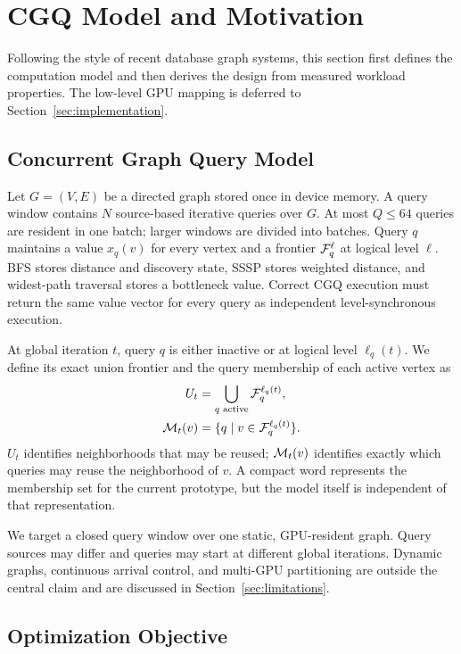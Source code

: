 \section{CGQ Model and Motivation}
\label{sec:background}

Following the style of recent database graph systems, this section first defines the computation model and then derives the design from measured workload properties.  The low-level GPU mapping is deferred to Section~\ref{sec:implementation}.

\subsection{Concurrent Graph Query Model}

Let $G=(V,E)$ be a directed graph stored once in device memory.  A query window contains $N$ source-based iterative queries over $G$.  At most $Q\leq64$ queries are resident in one batch; larger windows are divided into batches.  Query $q$ maintains a value $x_q(v)$ for every vertex and a frontier $\mathcal{F}_q^{\ell}$ at logical level $\ell$.  BFS stores distance and discovery state, SSSP stores weighted distance, and widest-path traversal stores a bottleneck value.  Correct CGQ execution must return the same value vector for every query as independent level-synchronous execution.

At global iteration $t$, query $q$ is either inactive or at logical level $\ell_q(t)$.  We define its exact union frontier and the query membership of each active vertex as
\begin{align}
  U_t &= \bigcup_{q\text{ active}} \mathcal{F}_q^{\ell_q(t)}, \\
  \mathcal{M}_t(v) &= \{q \mid v\in\mathcal{F}_q^{\ell_q(t)}\}.
\end{align}
$U_t$ identifies neighborhoods that may be reused; $\mathcal{M}_t(v)$ identifies exactly which queries may reuse the neighborhood of $v$.  A compact word represents the membership set for the current prototype, but the model itself is independent of that representation.

We target a closed query window over one static, GPU-resident graph.  Query sources may differ and queries may start at different global iterations.  Dynamic graphs, continuous arrival control, and multi-GPU partitioning are outside the central claim and are discussed in Section~\ref{sec:limitations}.

\subsection{Optimization Objective}

